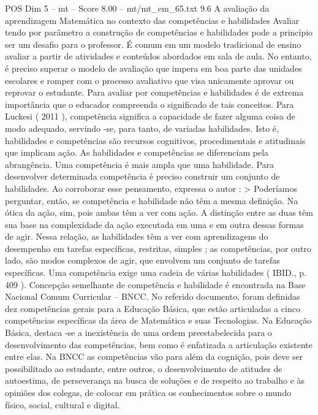 \begin{textsample}{POS Dim 5 – mt – Score 8.00 – mt/mt\_em\_65.txt}  \label{ex:f5_pos_086}
9.6 A avaliação da aprendizagem Matemática no contexto das competências e habilidades Avaliar tendo por parâmetro a construção de competências e habilidades pode a princípio ser um desafio para o professor.
É comum em um modelo tradicional de ensino avaliar a partir de atividades e conteúdos abordados em sala de aula.
No entanto, é preciso superar o modelo de avaliação que impera em boa parte das unidades escolares e romper com o processo avaliativo que visa unicamente aprovar ou reprovar o estudante.
Para avaliar por competências e habilidades é de extrema importância que o educador compreenda o significado de tais conceitos.
Para Luckesi ( 2011 ), competência significa a capacidade de fazer alguma coisa de modo adequado, servindo -se, para tanto, de variadas habilidades.
Isto é, habilidades e competências são recursos cognitivos, procedimentais e atitudinais que implicam ação.
As habilidades e competências se diferenciam pela abrangência.
Uma competência é mais ampla que uma habilidade.
Para desenvolver determinada competência é preciso construir um conjunto de habilidades.
Ao corroborar esse pensamento, expressa o autor : > Poderíamos perguntar, então, se competência e habilidade não têm a mesma definição.
Na ótica da ação, sim, pois ambas têm a ver com ação.
A distinção entre as duas têm sua base na complexidade da ação executada em uma e em outra dessas formas de agir.
Nessa relação, as habilidades têm a ver com aprendizagens do desempenho em tarefas específicas, restritas, simples ; as competências, por outro lado, são modos complexos de agir, que envolvem um conjunto de tarefas específicas.
Uma competência exige uma cadeia de várias habilidades ( IBID., p. 409 ).
Concepção semelhante de competência e habilidade é encontrada na Base Nacional Comum Curricular – BNCC.
No referido documento, foram definidas dez competências gerais para a Educação Básica, que estão articuladas a cinco competências específicas da área de Matemática e suas Tecnologias.
Na Educação Básica, destaca -se a inexistência de uma ordem preestabelecida para o desenvolvimento das competências, bem como é enfatizada a articulação existente entre elas.
Na BNCC as competências vão para além da cognição, pois deve ser possibilitado ao estudante, entre outros, o desenvolvimento de atitudes de autoestima, de perseverança na busca de soluções e de respeito ao trabalho e às opiniões dos colegas, de colocar em prática os conhecimentos sobre o mundo físico, social, cultural e digital.

\end{textsample}
